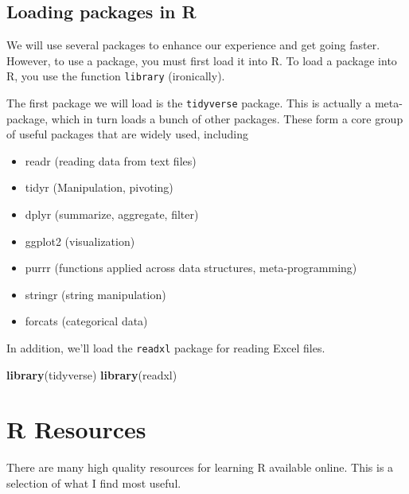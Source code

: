 \documentclass[12pt,letterpaperpaper,openany]{book}
\newenvironment{Shaded}{\begin{snugshade}}{\end{snugshade}}
\newcommand{\KeywordTok}[1]{\textcolor[rgb]{0.13,0.29,0.53}{\textbf{#1}}}
\newcommand{\NormalTok}[1]{#1}
\providecommand{\tightlist}{%
  \setlength{\itemsep}{0pt}\setlength{\parskip}{0pt}}
\begin{document}
\hypertarget{loading-packages-in-r}{%
\subsection{Loading packages in R}\label{loading-packages-in-r}}

We will use several packages to enhance our experience and get going faster. However, to use a package, you must first load it into R. To load a package into R, you use the function \texttt{library} (ironically).

The first package we will load is the \texttt{tidyverse} package. This is actually a meta-package, which in turn loads a bunch of other packages. These form a core group of useful packages that are widely used, including

\begin{itemize}
\tightlist
\item
  readr (reading data from text files)
\item
  tidyr (Manipulation, pivoting)
\item
  dplyr (summarize, aggregate, filter)
\item
  ggplot2 (visualization)
\item
  purrr (functions applied across data structures, meta-programming)
\item
  stringr (string manipulation)
\item
  forcats (categorical data)
\end{itemize}

In addition, we'll load the \texttt{readxl} package for reading Excel files.

\begin{Shaded}
\begin{Highlighting}[]
\KeywordTok{library}\NormalTok{(tidyverse)}
\KeywordTok{library}\NormalTok{(readxl)}
\end{Highlighting}
\end{Shaded}

\hypertarget{r-resources}{%
\section{R Resources}\label{r-resources}}

There are many high quality resources for learning R available online. This is a selection of
what I find most useful.
\end{document}
